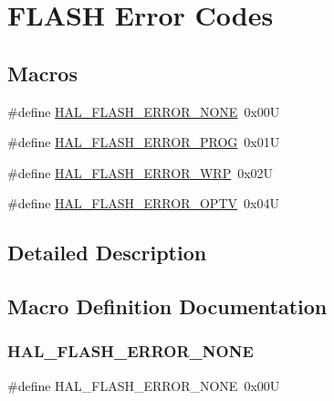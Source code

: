\hypertarget{group___f_l_a_s_h___error___codes}{}\section{F\+L\+A\+SH Error Codes}
\label{group___f_l_a_s_h___error___codes}
\subsection*{Macros}
\begin{DoxyCompactItemize}
\item 
\#define \hyperlink{group___f_l_a_s_h___error___codes_gae7fb9ee7198d393aba27ade3a9f50a70}{H\+A\+L\+\_\+\+F\+L\+A\+S\+H\+\_\+\+E\+R\+R\+O\+R\+\_\+\+N\+O\+NE}~0x00U
\item 
\#define \hyperlink{group___f_l_a_s_h___error___codes_ga516a75e6f98eed9daefa0b442a74c04b}{H\+A\+L\+\_\+\+F\+L\+A\+S\+H\+\_\+\+E\+R\+R\+O\+R\+\_\+\+P\+R\+OG}~0x01U
\item 
\#define \hyperlink{group___f_l_a_s_h___error___codes_ga27e871d85f9311272098315bc3723075}{H\+A\+L\+\_\+\+F\+L\+A\+S\+H\+\_\+\+E\+R\+R\+O\+R\+\_\+\+W\+RP}~0x02U
\item 
\#define \hyperlink{group___f_l_a_s_h___error___codes_ga9fe984a57c2e92c27c4217468d1b2d93}{H\+A\+L\+\_\+\+F\+L\+A\+S\+H\+\_\+\+E\+R\+R\+O\+R\+\_\+\+O\+P\+TV}~0x04U
\end{DoxyCompactItemize}


\subsection{Detailed Description}


\subsection{Macro Definition Documentation}
\mbox{\label{group___f_l_a_s_h___error___codes_gae7fb9ee7198d393aba27ade3a9f50a70}} 
\subsubsection{\texorpdfstring{H\+A\+L\+\_\+\+F\+L\+A\+S\+H\+\_\+\+E\+R\+R\+O\+R\+\_\+\+N\+O\+NE}{HAL\_FLASH\_ERROR\_NONE}}
{\footnotesize\ttfamily \#define H\+A\+L\+\_\+\+F\+L\+A\+S\+H\+\_\+\+E\+R\+R\+O\+R\+\_\+\+N\+O\+NE~0x00U}

